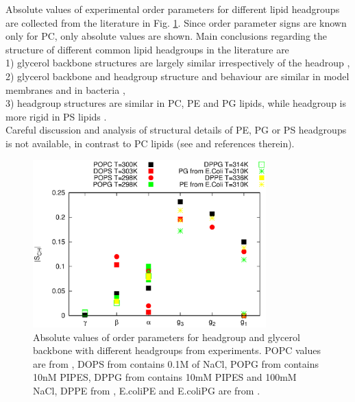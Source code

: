 \documentclass[aps,prl,superscriptaddress,twocolumn]{revtex4}
\begin{document}
Absolute values of experimental order parameters for different lipid headgroups are
collected from the literature in Fig. \ref{HGorderParameters}. Since order parameter
signs are known only for PC, only absolute values are shown.
Main conclusions regarding the structure of different common lipid headgroups in the literature are \\
1) glycerol backbone structures are largely similar irrespectively of the headroup \cite{gally81}, \\
2) glycerol backbone and headgroup structure and behaviour are similar in model membranes and in bacteria \cite{gally81,scherer87,seelig90}, \\
3) headgroup structures are similar in PC, PE and PG lipids, while headgroup is more rigid in PS lipids \cite{wohlgemuth80,buldt81}. \\
Careful discussion and analysis of structural details of PE, PG or PS headgroups is not available, 
in contrast to PC lipids (see \cite{botan15} and references therein).
\begin{figure}[]
  \centering
  \includegraphics[width=9.0cm]{../Figs/HGorderparameters.eps}
  \caption{\label{HGorderParameters}
    Absolute values of order parameters for headgroup and glycerol backbone with different headgroups
    from experiments. POPC values are from \cite{ferreira13}, DOPS from \cite{browning80} contains 0.1M of NaCl,
    POPG from \cite{borle85} contains 10nM PIPES, DPPG from \cite{wohlgemuth80} contains  10mM PIPES and 100mM NaCl,
    DPPE from \cite{seelig76}, E.coliPE and E.coliPG are from \cite{gally81}.
  }
\end{figure}
\end{document}
